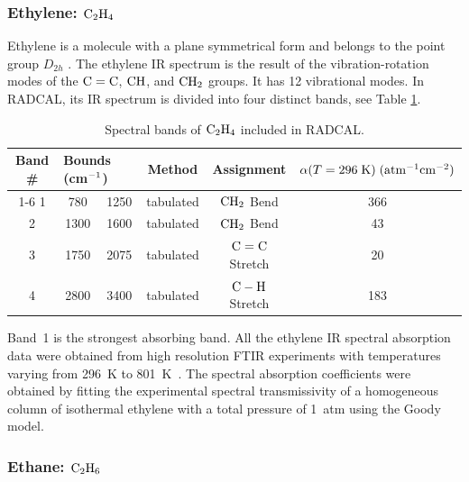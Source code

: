 \subsubsection{Ethylene: $\rm C_2H_4$}

Ethylene is a molecule with a plane symmetrical form and belongs to the point group $D_{2h}$ \cite{Herzberg:1949}. The ethylene IR spectrum is the result of the vibration-rotation modes of the $\rm C=C$, $\rm CH$, and $\rm CH_2$ groups. It has 12 vibrational modes. In RADCAL, its IR spectrum is divided into four distinct bands, see Table \ref{Table::C2H4}.
\begin{table}[ht]
    \centering
    \caption[Spectral bands of $\rm C_2H_4$ included in RADCAL]{Spectral bands of $\rm C_2H_4$ included in RADCAL.}
    \vspace{0.1in}
    \label{Table::C2H4}
    \begin{tabular}{|c|c|c|c|c|c|}
      \hline
      Band \# & \multicolumn{2}{|l|}{Bounds (cm$\rm ^{-1}$) } & Method & Assignment & $\alpha(T=296 \; {\rm K}) \; (\rm {atm^{-1} cm^{-2}})$\\
      \cline{1-6}
      1 & 780  & 1250 & tabulated &  $\rm CH_2$ Bend      & 366 \\
      2 & 1300 & 1600 & tabulated &  $\rm CH_2$ Bend      & 43\\
      3 & 1750 & 2075 & tabulated &  $\rm C=C$  Stretch   & 20 \\
      4 & 2800 & 3400 & tabulated &  $\rm C-H$  Stretch   & 183 \\
      \hline
    \end{tabular}
\end{table}
Band~1 is the strongest absorbing band. All the ethylene IR spectral absorption data were obtained from high resolution FTIR experiments with temperatures varying from 296~K to 801~K~\cite{Wakatsuki:2005}. The spectral absorption coefficients were obtained by fitting the experimental spectral transmissivity of a homogeneous column of isothermal ethylene with a total pressure of 1~atm using the Goody model.

\subsubsection{Ethane: $\rm C_2H_6$}

